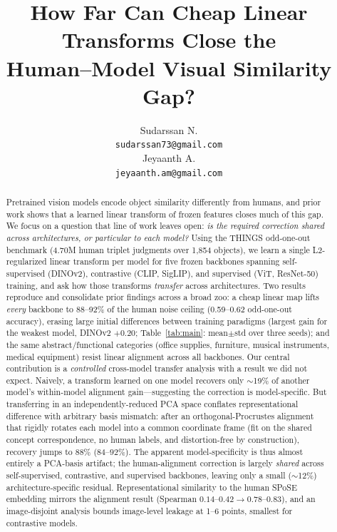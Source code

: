 \documentclass{article}
\title{How Far Can Cheap Linear Transforms Close the\\
Human--Model Visual Similarity Gap?}
\author{%
  Sudarssan N. \\
  \texttt{sudarssan73@gmail.com} \\
  \AND
  Jeyaanth A. \\
  \texttt{jeyaanth.am@gmail.com} \\
}
\begin{document}
\maketitle

\begin{abstract}
Pretrained vision models encode object similarity differently from humans, and
prior work shows that a learned linear transform of frozen features closes much of
this gap. We focus on a question that line of work leaves open: \emph{is the
required correction shared across architectures, or particular to each model?}
Using the THINGS odd-one-out benchmark (4.70M human triplet judgments over 1{,}854
objects), we learn a single L2-regularized linear transform per model for five
frozen backbones spanning self-supervised (DINOv2), contrastive (CLIP, SigLIP),
and supervised (ViT, ResNet-50) training, and ask how those transforms
\emph{transfer} across architectures. Two results reproduce and consolidate prior
findings across a broad zoo: a cheap linear map lifts \emph{every} backbone to
88--92\% of the human noise ceiling (0.59--0.62 odd-one-out accuracy), erasing
large initial differences between training paradigms (largest gain for the weakest
model, DINOv2 $+0.20$; Table~\ref{tab:main}: mean$\pm$std over three seeds); and
the same abstract/functional categories (office
supplies, furniture, musical instruments, medical equipment) resist linear
alignment across all backbones. Our central contribution is a \emph{controlled}
cross-model transfer analysis with a result we did not expect. Naively, a transform
learned on one model recovers only $\sim$19\% of another model's within-model
alignment gain---suggesting the correction is model-specific. But transferring in an
independently-reduced PCA space conflates representational difference with arbitrary
basis mismatch: after an orthogonal-Procrustes alignment that rigidly rotates each
model into a common coordinate frame (fit on the shared concept correspondence, no
human labels, and distortion-free by construction), recovery jumps to $88\%$
($84$--$92\%$). The apparent model-specificity is thus almost entirely a PCA-basis
artifact; the human-alignment correction is largely \emph{shared} across
self-supervised, contrastive, and supervised backbones, leaving only a small
($\sim$12\%) architecture-specific residual. Representational similarity to the human
SPoSE embedding mirrors the alignment result (Spearman $0.14$--$0.42 \to
0.78$--$0.83$), and an image-disjoint analysis bounds image-level leakage at 1--6
points, smallest for contrastive models.
\end{abstract}
\end{document}
